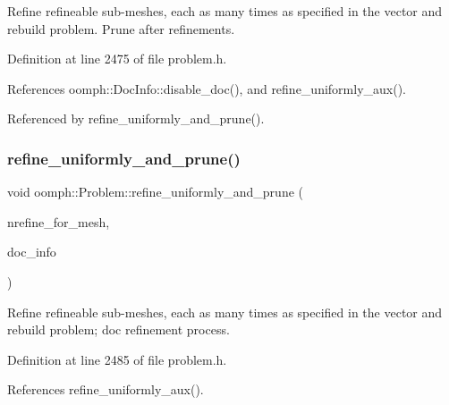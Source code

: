 Refine refineable sub-\/meshes, each as many times as specified in the vector and rebuild problem. Prune after refinements. 



Definition at line 2475 of file problem.\+h.



References oomph\+::\+Doc\+Info\+::disable\+\_\+doc(), and refine\+\_\+uniformly\+\_\+aux().



Referenced by refine\+\_\+uniformly\+\_\+and\+\_\+prune().

\mbox{\label{classoomph_1_1Problem_adea5168244acebb539fa29e36182ced3}} 
\subsubsection{\texorpdfstring{refine\+\_\+uniformly\+\_\+and\+\_\+prune()}{refine\_uniformly\_and\_prune()}\hspace{0.1cm}{\footnotesize\ttfamily [2/3]}}
{\footnotesize\ttfamily void oomph\+::\+Problem\+::refine\+\_\+uniformly\+\_\+and\+\_\+prune (\begin{DoxyParamCaption}\item[{const \hyperlink{classoomph_1_1Vector}{Vector}$<$ unsigned $>$ \&}]{nrefine\+\_\+for\+\_\+mesh,  }\item[{\hyperlink{classoomph_1_1DocInfo}{Doc\+Info} \&}]{doc\+\_\+info }\end{DoxyParamCaption})\hspace{0.3cm}{\ttfamily [inline]}}



Refine refineable sub-\/meshes, each as many times as specified in the vector and rebuild problem; doc refinement process. 



Definition at line 2485 of file problem.\+h.



References refine\+\_\+uniformly\+\_\+aux().

\mbox{\label{classoomph_1_1Problem_ac0495df29dde90577e4702fcac496684}} 
